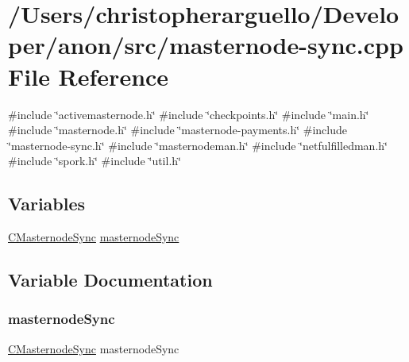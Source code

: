 \hypertarget{masternode-sync_8cpp}{}\section{/\+Users/christopherarguello/\+Developer/anon/src/masternode-\/sync.cpp File Reference}
\label{masternode-sync_8cpp}
{\ttfamily \#include \char`\"{}activemasternode.\+h\char`\"{}}\newline
{\ttfamily \#include \char`\"{}checkpoints.\+h\char`\"{}}\newline
{\ttfamily \#include \char`\"{}main.\+h\char`\"{}}\newline
{\ttfamily \#include \char`\"{}masternode.\+h\char`\"{}}\newline
{\ttfamily \#include \char`\"{}masternode-\/payments.\+h\char`\"{}}\newline
{\ttfamily \#include \char`\"{}masternode-\/sync.\+h\char`\"{}}\newline
{\ttfamily \#include \char`\"{}masternodeman.\+h\char`\"{}}\newline
{\ttfamily \#include \char`\"{}netfulfilledman.\+h\char`\"{}}\newline
{\ttfamily \#include \char`\"{}spork.\+h\char`\"{}}\newline
{\ttfamily \#include \char`\"{}util.\+h\char`\"{}}\newline
\subsection*{Variables}
\begin{DoxyCompactItemize}
\item 
\mbox{\hyperlink{class_c_masternode_sync}{C\+Masternode\+Sync}} \mbox{\hyperlink{masternode-sync_8cpp_a9807e6586e8a7cb25799ea4150520448}{masternode\+Sync}}
\end{DoxyCompactItemize}


\subsection{Variable Documentation}
\mbox{\label{masternode-sync_8cpp_a9807e6586e8a7cb25799ea4150520448}} 
\subsubsection{\texorpdfstring{masternode\+Sync}{masternodeSync}}
{\footnotesize\ttfamily \mbox{\hyperlink{class_c_masternode_sync}{C\+Masternode\+Sync}} masternode\+Sync}

